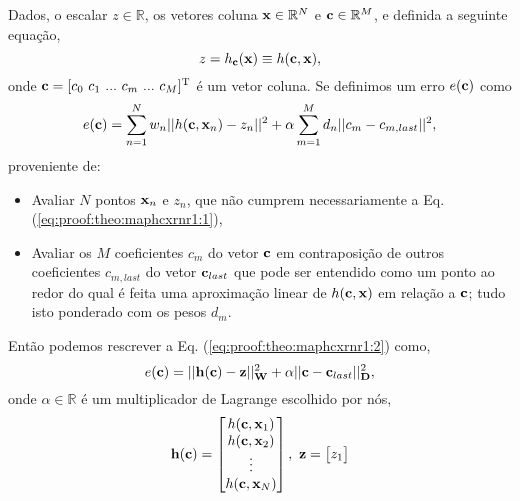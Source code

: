 \begin{myproofT}\label{proof:theo:maphcxrnr1}
Dados,
o escalar $z \in \mathbb{R}$, os vetores coluna $\VECTOR{x} \in \mathbb{R}^N$ e $\VECTOR{c} \in \mathbb{R}^M$, e 
definida a seguinte equação,
\begin{equation}\label{eq:proof:theo:maphcxrnr1:1}
z=h_{\VECTOR{c}}(\VECTOR{x})\equiv h(\VECTOR{c},\VECTOR{x}),
\end{equation}
onde $\VECTOR{c}=[c_0~ c_1~ ...~ c_m~ ...~ c_M]^{\transpose}$ é um vetor coluna.
Se definimos um erro $e(\VECTOR{c})$ como
\begin{equation}\label{eq:proof:theo:maphcxrnr1:2}
e(\VECTOR{c}) =  \sum_{n=1}^{N} w_n||h(\VECTOR{c},\VECTOR{x}_n)-z_n||^2 + \alpha \sum_{m=1}^{M} d_n||c_m-c_{m,last}||^2,
\end{equation}
proveniente de:
\begin{itemize}
\item Avaliar $N$ pontos $\VECTOR{x}_n$ e $z_n$, que não cumprem necessariamente a Eq. (\ref{eq:proof:theo:maphcxrnr1:1}), 
\item Avaliar os $M$ coeficientes $c_m$ do vetor $\VECTOR{c}$ 
em contraposição de outros coeficientes $c_{m,last}$ do vetor $\VECTOR{c}_{last}$
que pode ser entendido como um ponto ao redor do qual é feita uma aproximação
linear de $h(\VECTOR{c},\VECTOR{x})$ em relação a $\VECTOR{c}$; 
tudo isto ponderado com os pesos $d_m$.
\end{itemize}
Então podemos rescrever a Eq. (\ref{eq:proof:theo:maphcxrnr1:2}) como,
\begin{equation}\label{eq:proof:theo:maphcxrnr1:3}
e(\VECTOR{c}) =  ||\VECTOR{h}(\VECTOR{c})-\VECTOR{z}||_{\MATRIX{W}}^2 + \alpha||\VECTOR{c}-\VECTOR{c}_{last}||_{\MATRIX{D}}^2,
\end{equation}
onde $\alpha \in \mathbb{R}$ é um multiplicador de Lagrange escolhido por nós,
\begin{equation}
\VECTOR{h}(\VECTOR{c})=\begin{bmatrix}
h(\VECTOR{c},\VECTOR{x}_1)\\ 
h(\VECTOR{c},\VECTOR{x}_2)\\ 
\vdots\\ 
h(\VECTOR{c},\VECTOR{x}_N)
\end{bmatrix},
~
\VECTOR{z}=\begin{bmatrix}
z_1\\ 

\end{bmatrix}
\end{equation}
\end{myproofT}
